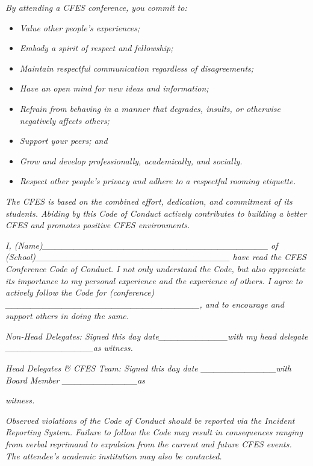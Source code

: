 \emph{By attending a CFES conference, you commit to:}

\begin{itemize}
 \item
  \emph{Value other people's experiences;}
 \item
  \emph{Embody a spirit of respect and fellowship;}
 \item
  \emph{Maintain respectful communication regardless of disagreements;}
 \item
  \emph{Have an open mind for new ideas and information;}
 \item
  \emph{Refrain from behaving in a manner that degrades, insults, or
   otherwise negatively affects others;}
 \item
  \emph{Support your peers; and}
 \item
  \emph{Grow and develop professionally, academically, and socially.}
 \item
  \emph{Respect other people's privacy and adhere to a respectful
   rooming etiquette.}
\end{itemize}

\emph{The CFES is based on the combined effort, dedication, and
 commitment of its students. Abiding by this Code of Conduct actively
 contributes to building a better CFES and promotes positive CFES
 environments.}

\emph{I,
 (Name)\_\_\_\_\_\_\_\_\_\_\_\_\_\_\_\_\_\_\_\_\_\_\_\_\_\_\_\_\_\_\_\_\_\_\_\_
 of
 (School)\_\_\_\_\_\_\_\_\_\_\_\_\_\_\_\_\_\_\_\_\_\_\_\_\_\_\_\_\_\_\_
 have read the CFES Conference Code of Conduct. I not only understand the
 Code, but also appreciate its importance to my personal experience and
 the experience of others. I agree to actively follow the Code for
 (conference)
 \_\_\_\_\_\_\_\_\_\_\_\_\_\_\_\_\_\_\_\_\_\_\_\_\_\_\_\_\_\_\_, and to
 encourage and support others in doing the same.}

\emph{Non-Head Delegates: Signed this day date\_\_\_\_\_\_\_\_\_\_\_with
 my head delegate \_\_\_\_\_\_\_\_\_\_\_\_\_\_as witness.}

\emph{Head Delegates \& CFES Team: Signed this day date
 \_\_\_\_\_\_\_\_\_\_\_\_with Board Member \_\_\_\_\_\_\_\_\_\_\_\_as}

\emph{witness.}

\emph{Observed violations of the Code of Conduct should be reported via
 the Incident Reporting System. Failure to follow the Code may result in
 consequences ranging from verbal reprimand to expulsion from the current
 and future CFES events. The attendee's academic institution may also be
 contacted.}


